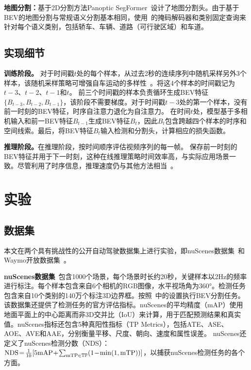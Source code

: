 \documentclass{article}
\begin{document}
\noindent\textbf{地图分割：}基于2D分割方法Panoptic SegFormer~\cite{li2021panoptic}设计了地图分割头。由于基于BEV的地图分割与常规语义分割基本相同，使用~\cite{li2021panoptic}的掩码解码器和类别固定查询来针对每个语义类别，包括轿车、车辆、道路（可行驶区域）和车道。





\subsection{实现细节}
\noindent\textbf{训练阶段。}
对于时间戳$t$处的每个样本，从过去2秒的连续序列中随机采样另外3个样本，该随机采样策略可增强自车运动的多样性~\cite{zhu2017deep}。将这4个样本的时间戳记为$t\!-\!3$、$t\!-\!2$、$t\!-\!1$和$t$。
前三个时间戳的样本负责循环生成BEV特征$\{B_{t-3}, B_{t-2}, B_{t-1}\}$，该阶段不需要梯度。对于时间戳$t\!-\!3$处的第一个样本，没有前一时刻的BEV特征，时序自注意力退化为自注意力。
在时间$t$处，模型基于多相机输入和前一BEV特征$B_{t-1}$生成BEV特征$B_t$，因此$B_t$包含跨越四个样本的时序和空间线索。最后，将BEV特征$B_t$输入检测和分割头，计算相应的损失函数。



\noindent\textbf{推理阶段。}在推理阶段，按时间顺序评估视频序列的每一帧。
保存前一时刻的BEV特征并用于下一时刻，这种在线推理策略时间效率高，与实际应用场景一致。尽管利用了时序信息，推理速度仍与其他方法相当~\cite{wang2021fcos3d,wang2022detr3d}。


\section{实验}
\subsection{数据集}
本文在两个具有挑战性的公开自动驾驶数据集上进行实验，即nuScenes数据集~\cite{caesar2020nuscenes}和Waymo开放数据集~\cite{sun2020scalability}。

\noindent\textbf{nuScenes数据集}~\cite{caesar2020nuscenes}包含1000个场景，每个场景时长约20秒，关键样本以2Hz的频率进行标注。每个样本包含来自6个相机的RGB图像，水平视场角为360°。检测任务包含来自10个类别的140万个标注3D边界框。按照~\cite{philion2020lift}中的设置执行BEV分割任务。
该数据集还提供了检测任务的官方评估指标。nuScenes的平均精度（mAP）使用地面平面上的中心距离而非3D交并比（IoU）来计算，用于匹配预测结果和真实值。nuScenes指标还包含5种真阳性指标（TP Metrics），包括ATE、ASE、AOE、AVE和AAE，分别衡量平移、尺度、朝向、速度和属性误差。
nuScenes还定义了nuScenes检测分数（NDS）：
${\rm NDS}\!=\!\frac{1}{10}[5{\rm mAP}\!+\!\sum_{{\rm mTP}\in \mathbb{TP}} (1\!-\!{\rm min}(1,{\rm mTP}))]$，以捕获nuScenes检测任务的各个方面。
\end{document}
